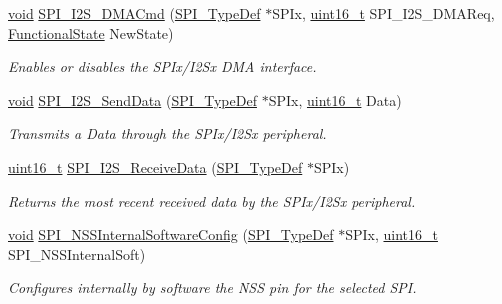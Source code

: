 \begin{DoxyCompactItemize}
\hyperlink{usb__devapi_8h_afabf60e7f57651d6d595a02c75f07cd0}{void} \hyperlink{group___s_p_i___exported___functions_gabed5b91a8576e6d578f364cc0e807e4a}{S\+P\+I\+\_\+\+I2\+S\+\_\+\+D\+M\+A\+Cmd} (\hyperlink{struct_s_p_i___type_def}{S\+P\+I\+\_\+\+Type\+Def} $\ast$S\+P\+Ix, \hyperlink{_p_e___types_8h_a1f1825b69244eb3ad2c7165ddc99c956}{uint16\+\_\+t} S\+P\+I\+\_\+\+I2\+S\+\_\+\+D\+M\+A\+Req, \hyperlink{agilefox_2library_2inc_2stm32f10x__type_8h_ac9a7e9a35d2513ec15c3b537aaa4fba1}{Functional\+State} New\+State)
\begin{DoxyCompactList}\small\item\em Enables or disables the S\+P\+Ix/\+I2\+Sx D\+MA interface. \end{DoxyCompactList}\item 
\hyperlink{usb__devapi_8h_afabf60e7f57651d6d595a02c75f07cd0}{void} \hyperlink{group___s_p_i___exported___functions_gad5af40bebe8dbe3fa8bd476489d7e3da}{S\+P\+I\+\_\+\+I2\+S\+\_\+\+Send\+Data} (\hyperlink{struct_s_p_i___type_def}{S\+P\+I\+\_\+\+Type\+Def} $\ast$S\+P\+Ix, \hyperlink{_p_e___types_8h_a1f1825b69244eb3ad2c7165ddc99c956}{uint16\+\_\+t} Data)
\begin{DoxyCompactList}\small\item\em Transmits a Data through the S\+P\+Ix/\+I2\+Sx peripheral. \end{DoxyCompactList}\item 
\hyperlink{_p_e___types_8h_a1f1825b69244eb3ad2c7165ddc99c956}{uint16\+\_\+t} \hyperlink{group___s_p_i___exported___functions_gab77de76547f3bff403236b263b070a30}{S\+P\+I\+\_\+\+I2\+S\+\_\+\+Receive\+Data} (\hyperlink{struct_s_p_i___type_def}{S\+P\+I\+\_\+\+Type\+Def} $\ast$S\+P\+Ix)
\begin{DoxyCompactList}\small\item\em Returns the most recent received data by the S\+P\+Ix/\+I2\+Sx peripheral. \end{DoxyCompactList}\item 
\hyperlink{usb__devapi_8h_afabf60e7f57651d6d595a02c75f07cd0}{void} \hyperlink{group___s_p_i___exported___functions_ga56fc508a482f032f9eb80e4c63184126}{S\+P\+I\+\_\+\+N\+S\+S\+Internal\+Software\+Config} (\hyperlink{struct_s_p_i___type_def}{S\+P\+I\+\_\+\+Type\+Def} $\ast$S\+P\+Ix, \hyperlink{_p_e___types_8h_a1f1825b69244eb3ad2c7165ddc99c956}{uint16\+\_\+t} S\+P\+I\+\_\+\+N\+S\+S\+Internal\+Soft)
\begin{DoxyCompactList}\small\item\em Configures internally by software the N\+SS pin for the selected S\+PI. \end{DoxyCompactList}\item 

\end{DoxyCompactItemize}

